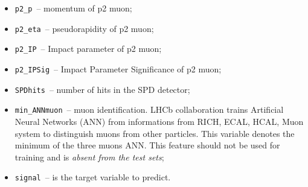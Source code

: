 \documentclass[conference]{IEEEtran}
\begin{document}
\begin{itemize}
	\item \texttt{p2\_p}~-- momentum of p2 muon;
	\item \texttt{p2\_eta}~-- pseudorapidity of p2 muon;
	\item \texttt{p2\_IP}~-- Impact parameter of p2 muon;
	\item \texttt{p2\_IPSig}~-- Impact Parameter Significance of p2 muon;
	\item \texttt{SPDhits}~-- number of hits in the SPD detector;
	\item \texttt{min\_ANNmuon}~-- muon identification. LHCb collaboration trains
  	Artificial Neural Networks (ANN) from informations from RICH, ECAL,
  	HCAL, Muon system to distinguish muons from other particles. This
  	variable denotes the minimum of the three muons ANN. This feature
  	should not be used for training and is \textit{absent from the test
		sets};
	\item \texttt{signal}~-- is the target variable to predict.
\end{itemize}
\end{document}
